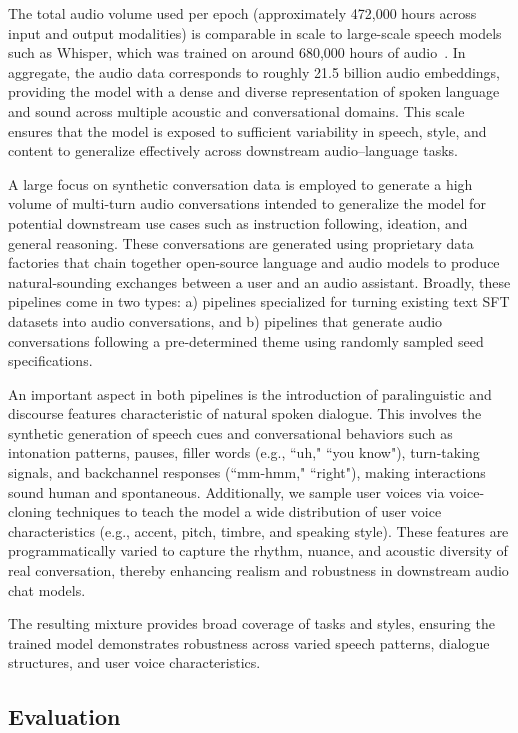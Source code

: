 \documentclass{article}
\begin{document}
The total audio volume used per epoch (approximately 472,000 hours across input and output modalities) is comparable in scale to large-scale speech models such as Whisper, which was trained on around 680,000 hours of audio~\citep{radford2023robust}. In aggregate, the audio data corresponds to roughly 21.5 billion audio embeddings, providing the model with a dense and diverse representation of spoken language and sound across multiple acoustic and conversational domains. This scale ensures that the model is exposed to sufficient variability in speech, style, and content to generalize effectively across downstream audio–language tasks.

A large focus on synthetic conversation data is employed to generate a high volume of multi-turn audio conversations intended to generalize the model for potential downstream use cases such as instruction following, ideation, and general reasoning. These conversations are generated using proprietary data factories that chain together open-source language and audio models to produce natural-sounding exchanges between a user and an audio assistant. Broadly, these pipelines come in two types:
a) pipelines specialized for turning existing text SFT datasets into audio conversations, and
b) pipelines that generate audio conversations following a pre-determined theme using randomly sampled seed specifications.

An important aspect in both pipelines is the introduction of paralinguistic and discourse features characteristic of natural spoken dialogue. This involves the synthetic generation of speech cues and conversational behaviors such as intonation patterns, pauses, filler words (e.g., ``uh," ``you know"), turn-taking signals, and backchannel responses (``mm-hmm," ``right"), making interactions sound human and spontaneous. Additionally, we sample user voices via voice-cloning techniques to teach the model a wide distribution of user voice characteristics (e.g., accent, pitch, timbre, and speaking style). These features are programmatically varied to capture the rhythm, nuance, and acoustic diversity of real conversation, thereby enhancing realism and robustness in downstream audio chat models.

The resulting mixture provides broad coverage of tasks and styles, ensuring the trained model demonstrates robustness across varied speech patterns, dialogue structures, and user voice characteristics.

\subsection{Evaluation}
\label{sec:audio_eval}
\end{document}
